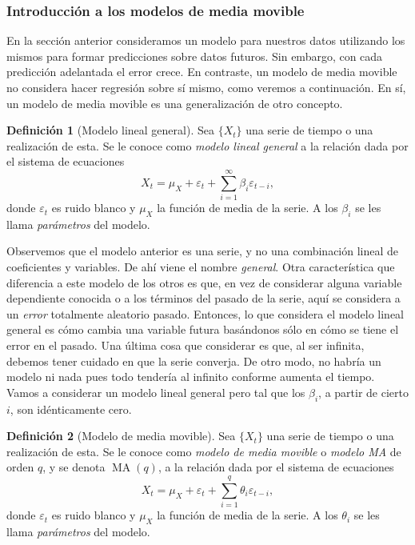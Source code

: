 \documentclass[11pt,letterpaper]{article}
\newcommand{\MA}{\ensuremath{\operatorname{MA}}}
\theoremstyle{definition}
\newtheorem{definition}{Definición}[section]
\theoremstyle{theorem}
\theoremstyle{remark}
\begin{document}
	\subsubsection{Introducción a los modelos de media movible}
	\noindent\justify En la sección anterior consideramos un modelo para nuestros datos utilizando los mismos para formar predicciones sobre datos futuros. Sin embargo, con cada predicción adelantada el error crece. En contraste, un modelo de media movible no considera hacer regresión sobre sí mismo, como veremos a continuación. En sí, un modelo de media movible es una generalización de otro concepto.
	\begin{definition}[Modelo lineal general]
		Sea \(\{X_t\}\) una serie de tiempo o una realización de esta. Se le conoce como \textit{modelo lineal general} a la relación dada por el sistema de ecuaciones
		\[X_t=\mu_X+\varepsilon_t+\sum_{i=1}^{\infty}\beta_i\varepsilon_{t-i},\]
		donde \(\varepsilon_t\) es ruido blanco y \(\mu_X\) la función de media de la serie. A los \(\beta_i\) se les llama \textit{parámetros} del modelo.
	\end{definition}
	Observemos que el modelo anterior es una serie, y no una combinación lineal de coeficientes y variables. De ahí viene el nombre \textit{general}. Otra característica que diferencia a este modelo de los otros es que, en vez de considerar alguna variable dependiente conocida o a los términos del pasado de la serie, aquí se considera a un \textit{error} totalmente aleatorio pasado. Entonces, lo que considera el modelo lineal general es cómo cambia una variable futura basándonos sólo en cómo se tiene el error en el pasado. Una última cosa que considerar es que, al ser infinita, debemos tener cuidado en que la serie converja. De otro modo, no habría un modelo ni nada pues todo tendería al infinito conforme aumenta el tiempo. \\
	Vamos a considerar un modelo lineal general pero tal que los \(\beta_i\), a partir de cierto \(i\), son idénticamente cero.
	\begin{definition}[Modelo de media movible]
		Sea \(\{X_t\}\) una serie de tiempo o una realización de esta. Se le conoce como \textit{modelo de media movible} o \textit{modelo MA} de orden \(q\), y se denota \(\MA(q)\), a la relación dada por el sistema de ecuaciones
		\[X_t=\mu_X+\varepsilon_t+\sum_{i=1}^{q}\theta_i\varepsilon_{t-i},\]
		donde \(\varepsilon_t\) es ruido blanco y \(\mu_X\) la función de media de la serie. A los \(\theta_i\) se les llama \textit{parámetros} del modelo.
	\end{definition}
\end{document}
